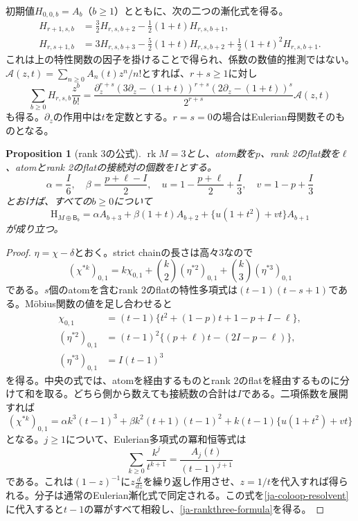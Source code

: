 \documentclass[12pt]{amsart}
\newtheorem{prop}[thm]{Proposition}
\theoremstyle{definition}
\theoremstyle{remark}
\numberwithin{equation}{section}
\newcommand{\rk}{\operatorname{rk}}
\newcommand{\HCh}{\mathrm{H}}
\newcommand{\Bmat}{\mathsf{B}}
\begin{document}
初期値$H_{0,0,b}=A_b$（$b\geq1$）とともに、次の二つの漸化式を得る。
\begin{align*}
 H_{r+1,s,b}&=\tfrac32H_{r,s,b+2}-\tfrac12(1+t)H_{r,s,b+1},\\
 H_{r,s+1,b}&=3H_{r,s,b+3}-\tfrac52(1+t)H_{r,s,b+2}
                         +\tfrac12(1+t)^2H_{r,s,b+1}.
\end{align*}
これは上の特性関数の因子を掛けることで得られ、係数の数値的推測ではない。$\mathcal A(z,t)=\sum_{n\geq0}A_n(t)z^n/n!$とすれば、$r+s\geq1$に対し
\begin{equation}\label{ja-block-egf}
 \sum_{b\geq0}H_{r,s,b}\frac{z^b}{b!}
 =\frac{\partial_z^{r+s}(3\partial_z-(1+t))^{r+s}
                (2\partial_z-(1+t))^s}{2^{r+s}}\mathcal A(z,t)
\end{equation}
も得る。$\partial_z$の作用中は$t$を定数とする。$r=s=0$の場合はEulerian母関数そのものとなる。

\begin{samepage}
\begin{prop}[rank 3の公式]\label{ja-rankthree}
$\rk M=3$とし、atom数を$p$、rank 2のflat数を$\ell$、atomとrank 2のflatの接続対の個数を$I$とする。
\begin{equation}\label{ja-parameters}
 \alpha=\frac I6,\quad \beta=\frac{p+\ell-I}{2},\quad
 u=1-\frac{p+\ell}{2}+\frac I3,\quad v=1-p+\frac I3
\end{equation}
とおけば、すべての$b\geq0$について
\begin{equation}\label{ja-rankthree-formula}
 \HCh_{M\oplus\Bmat_b}
 =\alpha A_{b+3}+\beta(1+t)A_{b+2}
       +\{u(1+t^2)+vt\}A_{b+1}
\end{equation}
が成り立つ。
\end{prop}
\end{samepage}
\begin{proof}
$\eta=\chi-\delta$とおく。strict chainの長さは高々3なので
\[
 (\chi^{*k})_{0,1}=k\chi_{0,1}+\binom{k}{2}(\eta^{*2})_{0,1}
                         +\binom{k}{3}(\eta^{*3})_{0,1}
\]
である。$s$個のatomを含むrank 2のflatの特性多項式は$(t-1)(t-s+1)$である。Möbius関数の値を足し合わせると
\begin{align*}
 \chi_{0,1}&=(t-1)\{t^2+(1-p)t+1-p+I-\ell\},\\
 (\eta^{*2})_{0,1}&=(t-1)^2\{(p+\ell)t-(2I-p-\ell)\},\\
 (\eta^{*3})_{0,1}&=I(t-1)^3
\end{align*}
を得る。中央の式では、atomを経由するものとrank 2のflatを経由するものに分けて和を取る。どちら側から数えても接続数の合計は$I$である。二項係数を展開すれば
\[
 (\chi^{*k})_{0,1}
 =\alpha k^3(t-1)^3+\beta k^2(t+1)(t-1)^2
   +k(t-1)\{u(1+t^2)+vt\}
\]
となる。$j\geq1$について、Eulerian多項式の冪和恒等式は
\[
 \sum_{k\geq0}\frac{k^j}{t^{k+1}}=\frac{A_j(t)}{(t-1)^{j+1}}
\]
である。これは$(1-z)^{-1}$に$z\frac{d}{dz}$を繰り返し作用させ、$z=1/t$を代入すれば得られる。分子は通常のEulerian漸化式で同定される。この式を\eqref{ja-coloop-resolvent}に代入すると$t-1$の冪がすべて相殺し、\eqref{ja-rankthree-formula}を得る。
\end{proof}
\end{document}
